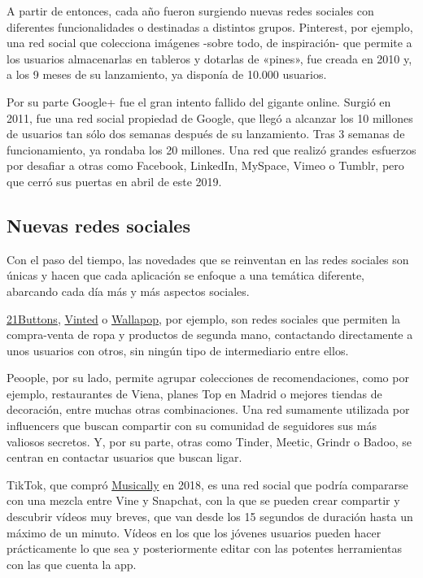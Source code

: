A partir de entonces, cada año fueron surgiendo nuevas redes sociales con diferentes funcionalidades o destinadas a distintos grupos. Pinterest, por ejemplo, una red social que colecciona imágenes -sobre todo, de inspiración- que permite a los usuarios almacenarlas en tableros y dotarlas de «pines», fue creada en 2010 y, a los 9 meses de su lanzamiento, ya disponía de 10.000 usuarios. 

Por su parte Google+ fue el gran intento fallido del gigante online. Surgió en 2011, fue una red social propiedad de Google, que llegó a alcanzar los 10 millones de usuarios tan sólo dos semanas después de su lanzamiento. Tras 3 semanas de funcionamiento, ya rondaba los 20 millones. Una red que realizó grandes esfuerzos por desafiar a otras como Facebook, LinkedIn, MySpace, Vimeo o Tumblr, pero que cerró sus puertas en abril de este 2019.

\subsection{Nuevas redes sociales}

Con el paso del tiempo, las novedades que se reinventan en las redes sociales son únicas y hacen que cada aplicación se enfoque a una temática diferente, abarcando cada día más y más aspectos sociales. 

\href{https://www.21buttons.com}{21Buttons}, \href{https://www.vinted.es}{Vinted} o \href{https://www.wallapop.com}{Wallapop}, por ejemplo, son redes sociales que permiten la compra-venta de ropa y productos de segunda mano, contactando directamente a unos usuarios con otros, sin ningún tipo de intermediario entre ellos.

Peoople, por su lado, permite agrupar colecciones de recomendaciones, como por ejemplo, restaurantes de Viena, planes Top en Madrid o mejores tiendas de decoración, entre muchas otras combinaciones. Una red sumamente utilizada por influencers que buscan compartir con su comunidad de seguidores sus más valiosos secretos. Y, por su parte, otras como Tinder, Meetic, Grindr o Badoo, se centran en contactar usuarios que buscan ligar.

TikTok, que compró \href{https://musically.com}{Musically} en 2018, es una red social que podría compararse con una mezcla entre Vine y Snapchat, con la que se pueden crear compartir y descubrir vídeos muy breves, que van desde los 15 segundos de duración hasta un máximo de un minuto. Vídeos en los que los jóvenes usuarios pueden hacer prácticamente lo que sea y posteriormente editar con las potentes herramientas con las que cuenta la app.

